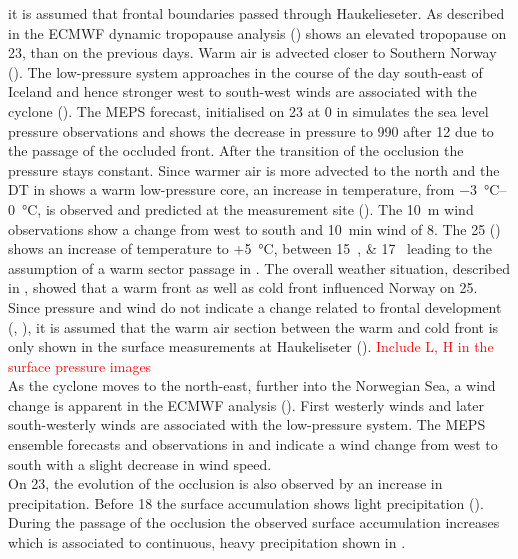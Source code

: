 it is assumed that frontal boundaries passed through Haukelieseter. 
As described in  the ECMWF dynamic tropopause analysis () shows an elevated tropopause %
on \SI{23}{\dec}, than on the previous days. Warm air is advected closer to Southern Norway (). The low-pressure system approaches in the course of the day south-east of Iceland and hence stronger west to south-west winds are associated with the cyclone (). The MEPS forecast, initialised on \SI{23}{\dec} at \SI{0}{\UTC} in  simulates the sea level pressure observations and shows the decrease in pressure to \SI{990}{\hPa} after \SI{12}{\UTC} due to the passage of the occluded front. After the transition of the occlusion the pressure stays constant. Since warmer air is more advected to the north and the DT in  shows a warm low-pressure core, an increase in temperature, from \SIrange{-3}{0}{\celsius}, is observed and predicted at the measurement site (). The \SI{10}{\metre} wind observations show a change from west to south and \SI{10}{\minute} wind of \SI{8}{\mPs}.
The \SI{25}{\dec} () shows an increase of temperature to +\SI{5}{\celsius}, between \SIlist{15;17}{\UTC} leading to the assumption of a warm sector passage in . The overall weather situation, described in , showed that a warm front as well as cold front influenced Norway on \SI{25}{\dec}. Since pressure and wind do not indicate a change related to frontal development (, ), it is assumed that the warm air section between the warm and cold front is only shown in the surface measurements at Haukeliseter ().  
\textcolor{red}{Include L, H in the surface pressure images}
\\
As the cyclone moves to the north-east, further into the Norwegian Sea, a wind change is apparent in the ECMWF analysis (). First westerly winds and later south-westerly winds are associated with the low-pressure system. The MEPS ensemble forecasts and observations in  and  indicate a wind change from west to south with a slight decrease in wind speed.
\\
On \SI{23}{\dec}, the evolution of the occlusion is also observed by an increase in precipitation. Before \SI{18}{\UTC} the surface accumulation shows light precipitation (). During the passage of the occlusion the observed surface accumulation increases which is associated to continuous, heavy precipitation shown in .
